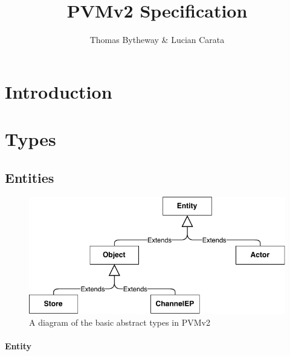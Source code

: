 \documentclass[12pt,twoside,openright,a4paper]{article}
\begin{document}
\title{PVMv2 Specification}
\author{Thomas Bytheway & Lucian Carata}

\begin{minipage}[h]{\textwidth}
    \maketitle
    \vspace{2in}
    {\small}
\end{minipage}

\normalsize



\clearpage

\section{Introduction}

\section{Types}

\subsection{Entities}
\begin{figure}[h]
\centering
\includegraphics{pvm_types.pdf}
\caption{A diagram of the basic abstract types in PVMv2}
\end{figure}

\paragraph{Entity}
\end{document}
